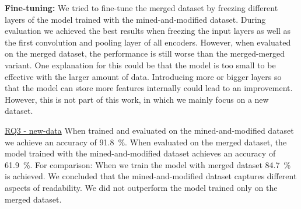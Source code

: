 \documentclass[%
class=scrreprt,
chapterprefix=false,%
open=right,%
twoside=false,%
paper=a4,%
logofile={Logo\_zentral\_farbig\_EN.png},%
thesistype=master,%
UKenglish,%
]{se2thesis}
\theoremstyle{definition}
\begin{document}
	
	\textbf{Fine-tuning:}
	We tried to fine-tune the merged dataset by freezing different layers of the model trained with the mined-and-modified dataset. During evaluation we achieved the best results when freezing the input layers as well as the first convolution and pooling layer of all encoders. 
	However, when evaluated on the merged dataset, the performance is still worse than the merged-merged variant.
	One explanation for this could be that the model is too small to be effective with the larger amount of data. Introducing more or bigger layers so that the model can store more features internally could lead to an improvement. However, this is not part of this work, in which we mainly focus on a new dataset.
	
	\begin{summary}{\hyperref[new-data]{RQ3 - new-data}}
		When trained and evaluated on the mined-and-modified dataset we achieve an accuracy of 91.8~\%.
		When evaluated on the merged dataset, the model trained with the mined-and-modified dataset achieves an accuracy of 61.9~\%. For comparison: When we train the model with merged dataset 84.7~\% is achieved.
		We concluded that the mined-and-modified dataset captures different aspects of readability. 
		We did not outperform the model trained only on the merged dataset.
	\end{summary}
	
	
\end{document}
